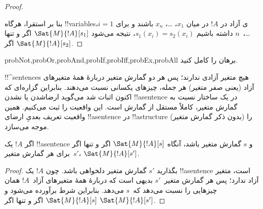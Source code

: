 \documentclass[../../../include/open-logic-section]{subfiles}
\begin{document}
\begin{proof}
\begin{enumerate}
\end{enumerate}
بنا بر استقرا، هرگاه !!{variable}sی آزاد در $!A$ در میان $x_1$، \dots،
$x_n$ باشند و برای $i = 1$، \dots،~$n$ داشته باشیم
$s_1(x_i)=s_2(x_i)$، نتیجه می‌شود $\Sat{M}{!A}[s_1]$ اگر و تنها اگر
$\Sat{M}{!A}[s_2]$.
\end{proof}

\begin{probtag}{probNot,probOr,probAnd,probIf,probIff,probEx,probAll}
برهان  را کامل کنید.
\end{probtag}

\begin{explain}
!!^{sentence}s هیچ متغیر آزادی ندارند؛ پس هر دو گمارش متغیر دربارهٔ همهٔ
متغیرهای آزاد (یعنی صفر متغیر) هر جمله، چیزهای یکسانی نسبت می‌دهند. بنابراین
گزاره‌ای که اکنون اثبات شد می‌گوید ارضاشدن یا نشدن !!a{sentence} در یک
ساختار نسبت به گمارش متغیر، کاملاً مستقل از گمارش است. این واقعیت را ثبت
می‌کنیم. همین واقعیت تعریف بعدیِ ارضای !!a{sentence} در !!a{structure}
(بدون ذکر گمارش متغیر) را موجه می‌سازد.
\end{explain}

\begin{cor}
اگر $!A$ یک !!a{sentence} و $s$ گمارش متغیر باشد، آنگاه
$\Sat{M}{!A}[s]$ اگر و تنها اگر برای هر گمارش متغیر~$s'$،
$\Sat{M}{!A}[s']$.
\end{cor}

\begin{proof}
  بگذارید $s'$ گمارش متغیر دلخواهی باشد. چون $!A$ یک !!a{sentence} است،
  متغیر آزاد ندارد؛ پس هر گمارش متغیر~$s'$ بدیهی است که دربارهٔ همهٔ
  متغیرهای آزاد~$!A$ همان چیزهایی را نسبت می‌دهد که~$s$ می‌دهد. بنابراین
  شرط  برآورده می‌شود و
  $\Sat{M}{!A}[s]$ اگر و تنها اگر $\Sat{M}{!A}[s']$.
\end{proof}
\end{document}
